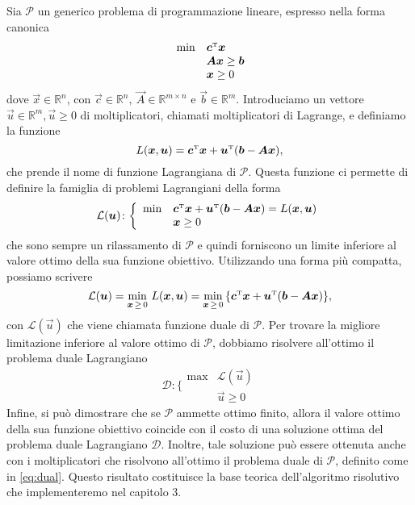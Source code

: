 Sia $\mathcal{P}$ un generico problema di programmazione lineare, espresso
nella forma canonica
\begin{equation}
    \begin{array}{ll}
        \,\min & \bm{c}^{\scriptscriptstyle\mathrm{T}} \bm{x} \\
               & \bm{A} \bm{x} \ge \bm{b} \\
             & \bm{x} \ge 0
    \end{array}
\end{equation}
dove $\vec{x} \in \mathbb{R}^n$, con $\vec{c} \in \mathbb{R}^n,\ \vec{A}
\in \mathbb{R}^{m \times n}$ e $\vec{b} \in \mathbb{R}^m$. Introduciamo un vettore \( \vec{u} \in \mathbb{R}^m, \vec{u}
\geq 0\) di moltiplicatori, chiamati moltiplicatori di Lagrange, e definiamo la funzione
\begin{equation}
    L(\bm{x}, \bm{u}) = \bm{c}^{\scriptscriptstyle\mathrm{T}} \bm{x} + \bm{u}^{\scriptscriptstyle\mathrm{T}}(\bm{b} - \bm{A}\bm{x}),
\end{equation}
che prende il nome di funzione Lagrangiana di \( \mathcal{P} \). Questa funzione ci permette di definire la famiglia di
problemi Lagrangiani della forma
\begin{equation}
    \mathcal{L}(\bm{u})\colon\bigg\{
    \begin{array}{ll}
        \min & \bm{c}^{\scriptscriptstyle\mathrm{T}} \bm{x} + \bm{u}^{\scriptscriptstyle\mathrm{T}}(\bm{b} - \bm{A}\bm{x}) = L(\bm{x}, \bm{u})\\
             & \bm{x} \geq 0
    \end{array}
\end{equation}
che sono sempre un rilassamento di \( \mathcal{P} \) e quindi forniscono un limite inferiore al valore ottimo della sua
funzione obiettivo. Utilizzando una forma più compatta, possiamo scrivere
\begin{equation}
    \mathcal{L}(\bm{u}) = \min_{\bm{x} \,\geq\, 0} \,L(\bm{x}, \bm{u}) = \min_{\bm{x} \,\geq\, 0}\,\{\bm{c}^{\scriptscriptstyle\mathrm{T}}
    \bm{x} + \bm{u}^{\scriptscriptstyle\mathrm{T}}(\bm{b} - \bm{A}\bm{x}) \},
\end{equation}
con \( \mathcal{L}(\vec{u}) \) che viene chiamata funzione duale di \( \mathcal{P} \). Per trovare la migliore
limitazione inferiore al valore ottimo di \( \mathcal{P} \), dobbiamo risolvere all'ottimo il problema duale Lagrangiano
\begin{equation}\label{eq:lagrangiandual}
    \mathcal{D}\colon\bigg\{
    \begin{array}{ll}
        \max & \mathcal{L}(\vec{u}) \\
             & \vec{u} \geq 0
    \end{array}
\end{equation}
Infine, si può dimostrare che se \( \mathcal{P} \) ammette ottimo finito, allora il valore ottimo della sua funzione
obiettivo coincide con il costo di una soluzione ottima del problema duale Lagrangiano \( \mathcal{D} \). Inoltre, tale
soluzione può essere ottenuta anche con i moltiplicatori che risolvono all'ottimo il problema duale di \( \mathcal{P}
\), definito come in \eqref{eq:dual}. Questo risultato costituisce la base teorica dell'algoritmo risolutivo che
implementeremo nel capitolo 3.

